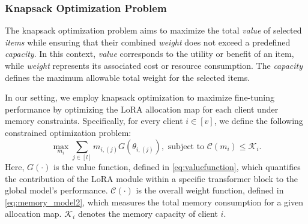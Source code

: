 \documentclass[sigconf]{acmart}
\begin{document}


\subsubsection{Knapsack Optimization Problem}


The knapsack optimization problem aims to maximize the total \textit{value} of selected \textit{items} while ensuring that their combined \textit{weight} does not exceed a predefined \textit{capacity}. In this context, \textit{value} corresponds to the utility or benefit of an {item}, while \textit{weight} represents its associated cost or resource consumption. The \textit{capacity} defines the maximum allowable total {weight} for the selected items.

In our setting, we employ knapsack optimization to maximize fine-tuning performance by optimizing the LoRA allocation map for each client under memory constraints. Specifically, for every client $i\in[v]$, we define the following constrained optimization problem: 
\begin{equation}\label{eq:optimization}
\max_{m_{i}} \sum_{j\in[l]}m_{i,(j)}{G}(\boldsymbol{\mathcal{\theta}}_{i, (j)}), \text{ subject to } \mathcal{C}(m_i) \leq\mathcal{K}_i.
\end{equation}
Here, ${G}(\cdot)$ is the value function, defined in \eqref{eq:valuefunction}, which quantifies the contribution of the LoRA module within a specific transformer block to the global model's performance.  $\mathcal{C}(\cdot)$ is the overall weight function, defined in \eqref{eq:memory_model2}, which measures the total memory consumption for a given allocation map. $\mathcal{K}_i$ denotes the memory capacity of client $i$. 
\end{document}
